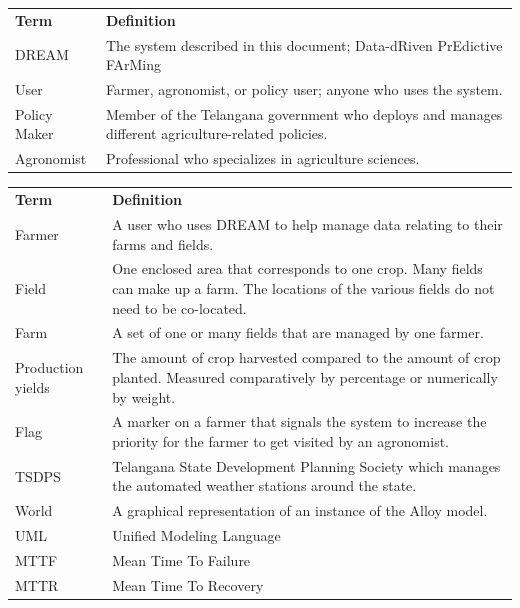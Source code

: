 
\begin{center}
\renewcommand{\arraystretch}{1.25}
\begin{tabular}{l >{\raggedright\arraybackslash}p{12cm} } \hline
    \textbf{Term} & \textbf{Definition}\\ 
    DREAM & The system described in this document; Data-dRiven PrEdictive FArMing\\
    User & Farmer, agronomist, or policy user; anyone who uses the system.\\
	Policy Maker & Member of the Telangana government who deploys and manages different agriculture-related policies. \\
	Agronomist & Professional who specializes in agriculture sciences. \\
\end{tabular}
\end{center}


\begin{center}
\renewcommand{\arraystretch}{1.25}
\begin{tabular}{l >{\raggedright\arraybackslash}p{12cm} } \hline
    \textbf{Term} & \textbf{Definition}\\
    Farmer & A user who uses DREAM to help manage data relating to their farms and fields.\\
    Field & One enclosed area that corresponds to one crop. Many fields can make up a farm. The locations of the various fields do not need to be co-located.\\
    Farm & A set of one or many fields that are managed by one farmer.\\
    Production yields & The amount of crop harvested compared to the amount of crop planted. Measured comparatively by percentage or numerically by weight.\\
    Flag & A marker on a farmer that signals the system to increase the priority for the farmer to get visited by an agronomist.\\
    TSDPS & Telangana State Development Planning Society which manages the automated weather stations around the state. \\
    World & A graphical representation of an instance of the Alloy model.\\
    UML & Unified Modeling Language\\
    MTTF & Mean Time To Failure\\
    MTTR & Mean Time To Recovery\\
    \hline
\end{tabular}
\end{center}

